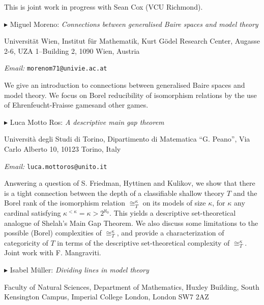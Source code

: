 \documentclass[a4paper]{amsart}
\theoremstyle{remark}
\newcommand{\vsp}{\vspace{20pt}}
\begin{document}
This is joint work in progress with Sean Cox (VCU Richmond). 








\vsp 

\noindent 
$\blacktriangleright$ Miguel Moreno: \emph{Connections between generalised Baire spaces and model theory} 

\noindent 
Universit\"at Wien, Institut f\"ur Mathematik, 
Kurt G\"odel Research Center, 
Augasse 2-6, UZA 1--Building 2, 
1090 Wien, Austria 

\noindent 
\emph{Email:} \texttt{morenom71@univie.ac.at}

We give an introduction to connections between generalised Baire spaces and model theory. We focus on Borel reducibility of isomorphism relations by the use of Ehrenfeucht-Fraisse gamesand other games. 










\vsp 

\noindent 
$\blacktriangleright$ Luca Motto Ros: \emph{A descriptive main gap theorem} 

\noindent 
Universit\`a degli Studi di Torino, Dipartimento di Matematica ``G. Peano'', Via Carlo Alberto 10, 10123 Torino, Italy

\noindent 
\emph{Email:} \texttt{luca.mottoros@unito.it}

Answering a question of S. Friedman, Hyttinen and Kulikov, we show that there is a tight connection between the depth of a classifiable shallow theory $T$ and the Borel rank of the isomorphism relation $\cong^\kappa_T$ on its models of size $\kappa$, for $\kappa$ any cardinal satisfying $\kappa^{< \kappa} = \kappa > 2^{\aleph_0}$. This yields a descriptive set-theoretical analogue of Shelah’s Main Gap Theorem. We also discuss some limitations to the possible (Borel) complexities of $\cong^\kappa_T$, and provide a characterization of categoricity of $T$ in terms of the descriptive set-theoretical complexity of $\cong^\kappa_T$. Joint work with F. Mangraviti.








\vsp 

\noindent 
$\blacktriangleright$ Isabel M\"uller: \emph{Dividing lines in model theory} 

\noindent 
Faculty of Natural Sciences, Department of Mathematics, 
Huxley Building, 
South Kensington Campus, 
Imperial College London, 
London 
SW7 2AZ
\end{document}
